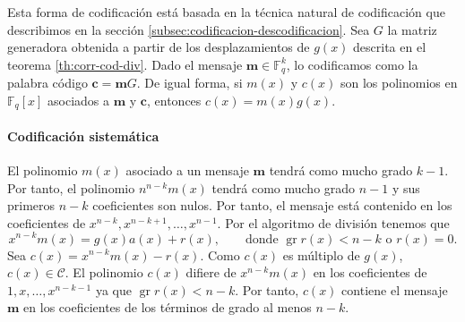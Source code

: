 Esta forma de codificación está basada en la técnica natural de codificación que describimos en la sección \ref{subsec:codificacion-descodificacion}.
Sea \(G\) la matriz generadora obtenida a partir de los desplazamientos de \(g(x)\) descrita en el teorema \ref{th:corr-cod-div}.
Dado el mensaje \(\mathbf m \in \mathbb F_q^k\), lo codificamos como la palabra código \(\mathbf c = \mathbf mG\).
De igual forma, si \(m(x)\) y \(c(x)\) son los polinomios en \(\mathbb F_q[x]\) asociados a \(\mathbf{m}\) y \(\mathbf c\), entonces \(c(x) = m(x)g(x)\).

\paragraph{Codificación sistemática}

El polinomio \(m(x)\) asociado a un mensaje \(\mathbf m\) tendrá como mucho grado \(k -1\).
Por tanto, el polinomio \(n^{n-k}m(x)\) tendrá como mucho grado \(n - 1\) y sus primeros \( n - k\) coeficientes son nulos.
Por tanto, el mensaje está contenido en los coeficientes de \(x^{n-k}, x^{n-k+1}, \dots, x^{n-1}\).
Por el algoritmo de división tenemos que
\[x^{n-k}m(x) = g(x)a(x) + r(x), \qquad \text{donde } \operatorname{gr} r(x) < n - k \text{ o } r(x) = 0.\]
Sea \(c(x) = x^{n-k}m(x) - r(x)\).
Como \(c(x)\) es múltiplo de \(g(x)\), \(c(x) \in \mathcal C\).
El polinomio \(c(x)\) difiere de \(x^{n-k}m(x)\) en los coeficientes de \(1, x, \dots, x^{n-k-1}\) ya que \(\operatorname{gr} r(x) < n-k\).
Por tanto, \(c(x)\) contiene el mensaje \(\mathbf m\) en los coeficientes de los términos de grado al menos \(n - k\).


